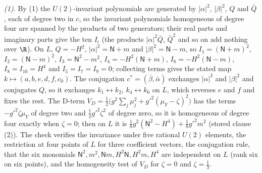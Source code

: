 \emph{(1).} By (1) the $U(2)$-invariant polynomials are generated by $|\alpha|^{2}$, $|\beta|^{2}$, $Q$ and $\bar{Q}$, each of degree two in $c$, so the invariant polynomials homogeneous of degree four are spanned by the products of two generators; their real parts and imaginary parts give the ten $I_{i}$ (the products $|\alpha|^{2}\bar{Q}$, $\bar{Q}^{2}$ and so on add nothing over $\R$). On $L$, $Q = -H^{2}$, $|\alpha|^{2} = \mathsf{N} + m$ and $|\beta|^{2} = \mathsf{N} - m$, so $I_{1} = (\mathsf{N} + m)^{2}$, $I_{2} = (\mathsf{N} - m)^{2}$, $I_{3} = \mathsf{N}^{2} - m^{2}$, $I_{4} = -H^{2}(\mathsf{N} + m)$, $I_{6} = -H^{2}(\mathsf{N} - m)$, $I_{8} = I_{10} = H^{4}$ and $I_{5} = I_{7} = I_{9} = 0$; collecting terms gives the stated map $k \mapsto (a, b, e, d, f, c_{0})$. The conjugation $c^{*} = (\bar{\beta}, \bar{\alpha})$ exchanges $|\alpha|^{2}$ and $|\beta|^{2}$ and conjugates $Q$, so it exchanges $k_{1} \leftrightarrow k_{2}$, $k_{4} \leftrightarrow k_{6}$ on $L$, which reverses $e$ and $f$ and fixes the rest. The D-term $V_{D} = \tfrac12\bigl(g^{2}\sum_{j}\mu_{j}^{2} + g'^{2}(\mu_{Y} - \zeta)^{2}\bigr)$ has the terms $-g'^{2}\zeta\mu_{Y}$ of degree two and $\tfrac12 g'^{2}\zeta^{2}$ of degree zero, so it is homogeneous of degree four exactly when $\zeta = 0$; then on $L$ it is $\tfrac18 g^{2}(\mathsf{N}^{2} - H^{4}) + \tfrac18 g'^{2}m^{2}$ (stored clause (2)). The check verifies the invariance under five rational $U(2)$ elements, the restriction at four points of $L$ for three coefficient vectors, the conjugation rule, that the six monomials $\mathsf{N}^{2}, m^{2}, \mathsf{N}m, H^{2}\mathsf{N}, H^{2}m, H^{4}$ are independent on $L$ (rank six on six points), and the homogeneity test of $V_{D}$ for $\zeta = 0$ and $\zeta = \tfrac13$.

